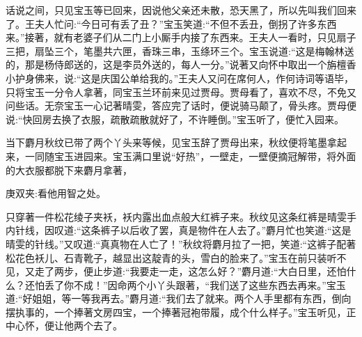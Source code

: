 \begin{parag}
    话说之间，只见宝玉等已回来，因说他父亲还未散，恐天黑了，所以先叫我们回来了。王夫人忙问:“今日可有丢了丑？”宝玉笑道:“不但不丢丑，倒拐了许多东西来。”接著，就有老婆子们从二门上小厮手内接了东西来。王夫人一看时，只见扇子三把，扇坠三个，笔墨共六匣，香珠三串，玉绦环三个。宝玉说道:“这是梅翰林送的，那是杨侍郎送的，这是李员外送的，每人一分。”说著又向怀中取出一个旃檀香小护身佛来，说:“这是庆国公单给我的。”王夫人又问在席何人，作何诗词等语毕，只将宝玉一分令人拿著，同宝玉兰环前来见过贾母。贾母看了，喜欢不尽，不免又问些话。无奈宝玉一心记著晴雯，答应完了话时，便说骑马颠了，骨头疼。贾母便说:“快回房去换了衣服，疏散疏散就好了，不许睡倒。”宝玉听了，便忙入园来。
\end{parag}


\begin{parag}
    当下麝月秋纹已带了两个丫头来等候，见宝玉辞了贾母出来，秋纹便将笔墨拿起来，一同随宝玉进园来。宝玉满口里说“好热”，一壁走，一壁便摘冠解带，将外面的大衣服都脱下来麝月拿著，\begin{note}庚双夹:看他用智之处。\end{note}只穿著一件松花绫子夹袄，袄内露出血点般大红裤子来。秋纹见这条红裤是晴雯手内针线，因叹道:“这条裤子以后收了罢，真是物件在人去了。”麝月忙也笑道:“这是晴雯的针线。”又叹道:“真真物在人亡了！”秋纹将麝月拉了一把，笑道:“这裤子配著松花色袄儿、石青靴子，越显出这靛青的头，雪白的脸来了。”宝玉在前只装听不见，又走了两步，便止步道:“我要走一走，这怎么好？”麝月道:“大白日里，还怕什么？还怕丢了你不成！”因命两个小丫头跟著，“我们送了这些东西去再来。”宝玉道:“好姐姐，等一等我再去。”麝月道:“我们去了就来。两个人手里都有东西，倒向摆执事的，一个捧著文房四宝，一个捧著冠袍带履，成个什么样子。”宝玉听见，正中心怀，便让他两个去了。
\end{parag}


